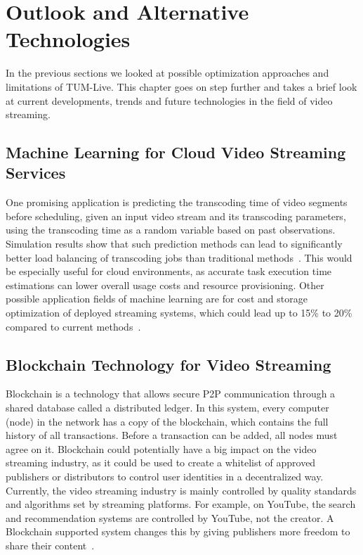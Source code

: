 
\chapter{Outlook and Alternative Technologies}\label{chapter:outlook}

In the previous sections we looked at possible optimization approaches and limitations of TUM-Live. This chapter goes on step further and takes a brief look at current developments, trends and future technologies in the field of video streaming.

\section{Machine Learning for Cloud Video Streaming Services}

One promising application is predicting the transcoding time of video segments before scheduling, given an input video stream and its transcoding parameters, using the transcoding time as a random variable based on past observations. Simulation results show that such prediction methods can lead to significantly better load balancing of transcoding jobs than traditional methods~\parencite{cloud_predicting}.
This would be especially useful for cloud environments, as accurate task execution time estimations can lower overall usage costs and resource provisioning. Other possible application fields of machine learning are for cost and storage optimization of deployed streaming systems, which could lead up to 15\% to 20\% compared to current methods~\parencite{deep_learning_cloud}.

\section{Blockchain Technology for Video Streaming}

Blockchain is a technology that allows secure \ac{P2P} communication through a shared database called a distributed ledger. In this system, every computer (node) in the network has a copy of the blockchain, which contains the full history of all transactions. Before a transaction can be added, all nodes must agree on it.
Blockchain could potentially have a big impact on the video streaming industry, as it could be used to create a whitelist of approved publishers or distributors to control user identities in a decentralized way.
Currently, the video streaming industry is mainly controlled by quality standards and algorithms set by streaming platforms. For example, on YouTube, the search and recommendation systems are controlled by YouTube, not the creator. A Blockchain supported system changes this by giving publishers more freedom to share their content~\parencite{cloud_streaming}.

